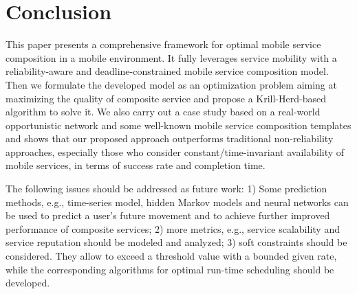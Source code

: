 \documentclass[journal]{IEEEtran}
\begin{document}
\section{Conclusion}
This paper presents a comprehensive framework for optimal mobile service composition in a mobile environment. It fully leverages service mobility with a reliability-aware and deadline-constrained mobile service composition model. Then we formulate the developed model as an optimization problem aiming at maximizing the quality of composite service and propose a Krill-Herd-based algorithm to solve it. We also carry out a case study based on a real-world opportunistic network and some well-known mobile service composition templates and shows that our proposed approach outperforms traditional non-reliability approaches, especially those who consider constant/time-invariant availability of mobile services, in terms of success rate and completion time.

The following issues should be addressed as future work: 1) Some prediction methods, e.g., time-series model, hidden Markov models and neural networks can be used to predict a user's future movement and to achieve further improved performance of composite services; 2) more metrics, e.g., service scalability and service reputation should be modeled and  analyzed; 3) soft constraints should be considered. They allow to exceed a threshold value with a bounded given rate, while the corresponding algorithms for optimal run-time scheduling should be developed.



\ifCLASSOPTIONcaptionsoff
  \newpage
\fi






\end{document}
